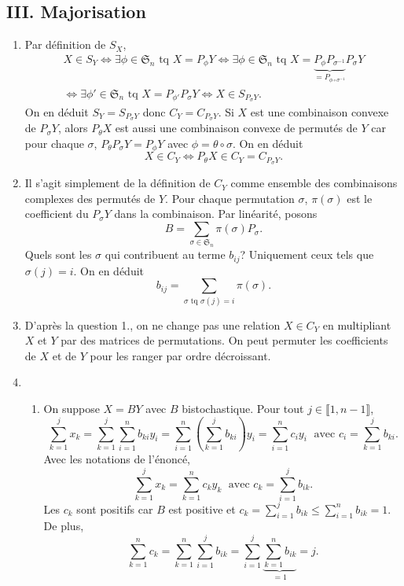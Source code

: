 \subsection*{III. Majorisation}
\begin{enumerate}
 \item Par définition de $S_X$,
\begin{multline*}
 X \in S_Y \Leftrightarrow \exists \phi \in \mathfrak{S}_n \text{ tq } X = P_\phi Y
 \Leftrightarrow \exists \phi \in \mathfrak{S}_n \text{ tq } X = \underset{ = P_{\phi \circ \sigma^{-1}}}{\underbrace{P_\phi P_{\sigma^{-1}}}} P_\sigma Y\\
 \Leftrightarrow \exists \phi' \in \mathfrak{S}_n \text{ tq } X = P_{\phi'}  P_\sigma Y
 \Leftrightarrow X \in S_{ P_\sigma Y}.
\end{multline*}
On en déduit $S_Y = S_{ P_\sigma Y}$ donc $C_Y = C_{ P_\sigma Y}$.\newline
Si $X$ est une combinaison convexe de $P_\sigma Y$, alors $P_\theta X$ est aussi une combinaison convexe de permutés de $Y$ car pour chaque $\sigma$, $P_\theta P_\sigma Y = P_\phi Y$ avec $\phi = \theta \circ \sigma$. On en déduit 
\[
 X \in C_Y \Leftrightarrow P_\theta X \in C_Y = C_{ P_\sigma Y}.
\]

 \item Il s'agit simplement de la définition de $C_Y$ comme ensemble des combinaisons complexes des permutés de $Y$. Pour chaque permutation $\sigma$, $\pi(\sigma)$ est le coefficient du $P_\sigma Y$ dans la combinaison. 
Par linéarité, posons
\[
 B = \sum_{\sigma \in \mathfrak{S}_n}\pi(\sigma)P_\sigma.
\]
Quels sont les $\sigma$ qui contribuent au terme $b_{i j}$? Uniquement ceux tels que $\sigma(j) = i$. On en déduit 
\[
 b_{i j} = \sum_{\sigma \text{ tq } \sigma(j) = i}\pi(\sigma).
\]

 \item D'après la question 1., on ne change pas une relation $X \in C_Y$ en multipliant $X$ et $Y$ par des matrices de permutations. On peut permuter les coefficients de $X$ et de $Y$ pour les ranger par ordre décroissant.
 
 \item
 \begin{enumerate}
  \item On suppose $X = BY$ avec $B$ bistochastique. Pour tout $j\in \llbracket 1, n-1 \rrbracket$,
\[
 \sum_{k=1}^{j}x_k = \sum_{k=1}^{j}\sum_{i=1}^{n}b_{k i} y_i 
 = \sum_{i=1}^{n}\left( \sum_{k=1}^{j}b_{k i}\right)y_i 
 = \sum_{i=1}^{n} c_i y_i\; \text{ avec } c_i = \sum_{k=1}^{j}b_{k i}. 
\]
Avec les notations de l'énoncé,
\[
 \sum_{k=1}^{j}x_k = \sum_{k=1}^{n} c_k y_k\; \text{ avec } c_k = \sum_{i=1}^{j}b_{i k}.
\]
Les $c_k$ sont positifs car $B$ est positive et $c_k = \sum_{i=1}^{j}b_{i k} \leq \sum_{i=1}^{n}b_{i k} = 1$. De plus,
\[
 \sum_{k=1}^{n} c_k = \sum_{k=1}^{n} \sum_{i=1}^{j}b_{i k} = \sum_{i=1}^{j} \underset{ = 1}{\underbrace{\sum_{k=1}^{n}b_{i k}}} = j.
\]


\end{enumerate}
\end{enumerate}
